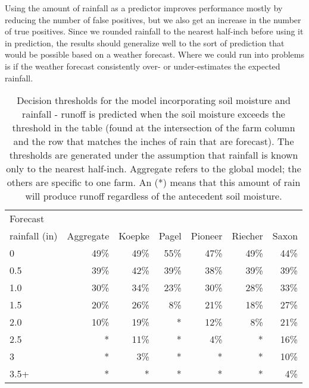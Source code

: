 \documentclass[11pt]{article}
\begin{document}
Using the amount of rainfall as a predictor improves performance mostly by reducing the number of false positives, but we also get an increase in the number of true positives. Since we rounded rainfall to the nearest half-inch before using it in prediction, the results should generalize well to the sort of prediction that would be possible based on a weather forecast. Where we could run into problems is if the weather forecast consistently over- or under-estimates the expected rainfall.\*

\begin{table}[h!]
\centering
	\linespread{1}
	\begin{tabular}{l r r r r r r}
		Forecast	&&&&&& \vspace{-5mm}\\
		rainfall (in) & Aggregate & Koepke & Pagel & Pioneer & Riecher & Saxon \\
		\hline 
		0 & 49\% & 49\% & 55\% & 47\% & 49\% & 44\%\\
		0.5 & 39\% & 42\% & 39\% & 38\% & 39\% & 39\% \\
		1.0 & 30\% & 34\% & 23\% & 30\% & 28\% & 33\% \\
		1.5 & 20\% & 26\% & 8\% & 21\% & 18\% & 27\% \\
		2.0 & 10\% & 19\% & * & 12\% & 8\% & 21\% \\
		2.5 & * & 11\% & * & 4\% & * & 16\%\\
		3 & * & 3\% & * & * & * & 10\%\\
		3.5+ & * & * & * & * & * & 4\%\\
		
	\end{tabular}
	\caption{Decision thresholds for the model incorporating soil moisture and rainfall - runoff is predicted when the soil moisture exceeds the threshold in the table (found at the intersection of the farm column and the row that matches the inches of rain that are forecast). The thresholds are generated under the assumption that rainfall is known only to the nearest half-inch. Aggregate refers to the global model; the others are specific to one farm. An (*) means that this amount of rain will produce runoff regardless of the antecedent soil moisture.\label{final_model}}
	\linespread{2}
\end{table}
\end{document}
